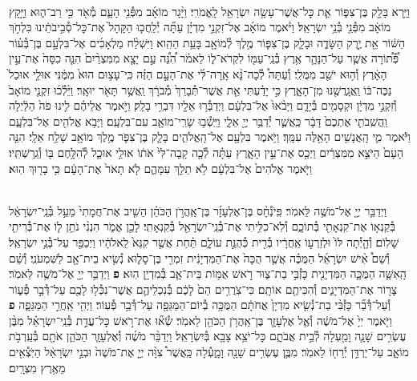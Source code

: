 \documentclass[twoside, openany, parskip=half, 11pt]{book}
\begin{document}
\begin{footnotesize}
\begin{multicols}{2}
\\
וַיַּ֥רְא בָּלָ֖ק בֶּן־צִפּ֑וֹר אֵ֛ת כׇּל־אֲשֶׁר־עָשָׂ֥ה יִשְׂרָאֵ֖ל לָֽאֱמֹרִֽי׃ וַיָּ֨גָר מוֹאָ֜ב מִפְּ֯נֵ֥י הָעָ֛ם מְ֯אֹ֖ד כִּ֣י רַב־ה֑וּא וַיָּ֣קָץ מוֹאָ֔ב מִפְּ֯נֵ֖י בְּ֯נֵ֥י יִשְׂרָאֵֽל׃ וַיֹּ֨אמֶר מוֹאָ֜ב אֶל־זִקְנֵ֣י מִדְיָ֗ן עַתָּ֞ה יְ֯לַֽחֲכ֤וּ הַקָּהָל֙ אֶת־כׇּל־סְ֯בִ֣יבֹתֵ֔ינוּ כִּלְחֹ֣ךְ הַשּׁ֔וֹר אֵ֖ת יֶ֣רֶק הַשָּׂדֶ֑ה וּבָלָ֧ק בֶּן־צִפּ֛וֹר מֶ֥לֶךְ לְ֯מוֹאָ֖ב בָּעֵ֥ת הַהִֽוא׃  וַיִּשְׁלַ֨ח מַלְאָכִ֜ים אֶל־בִּלְעָ֣ם בֶּן־בְּ֯ע֗וֹר פְּ֠֯ת֠וֹרָה אֲשֶׁ֧ר עַל־הַנָּהָ֛ר אֶ֥רֶץ בְּ֯נֵֽי־עַמּ֖וֹ לִקְרֹא־ל֑וֹ לֵאמֹ֗ר הִ֠נֵּ֠ה עַ֣ם יָצָ֤א מִמִּצְרַ֨יִם֙ הִנֵּ֤ה כִסָּה֙ אֶת־עֵ֣ין הָאָ֔רֶץ וְ֯ה֥וּא יֹשֵׁ֖ב מִמֻּלִֽי׃ וְ֯עַתָּה֩ לְ֯כָה־נָּ֨א אָֽרָה־לִּ֜י אֶת־הָעָ֣ם הַזֶּ֗ה כִּֽי־עָצ֥וּם הוּא֙ מִמֶּ֔נִּי אוּלַ֤י אוּכַל֙ נַכֶּה־בּ֔וֹ וַֽאֲגָֽרֲשֶׁ֖נּוּ מִן־הָאָ֑רֶץ כִּ֣י יָדַ֗עְתִּי אֵ֤ת אֲשֶׁר־תְּ֯בָרֵךְ֙ מְ֯בֹרָ֔ךְ וַֽאֲשֶׁ֥ר תָּאֹ֖ר יוּאָֽר׃ וַיֵּ֨לְ֯כ֜וּ זִקְנֵ֤י מוֹאָב֙ וְ֯זִקְנֵ֣י מִדְיָ֔ן וּקְסָמִ֖ים בְּ֯יָדָ֑ם וַיָּבֹ֨אוּ֙ אֶל־בִּלְעָ֔ם וַיְדַבְּ֯ר֥וּ אֵלָ֖יו דִּבְרֵ֥י בָלָֽק׃  וַיֹּ֣אמֶר אֲלֵיהֶ֗ם לִ֤ינוּ פֹה֙ הַלַּ֔יְלָה וַֽהֲשִֽׁבֹתִ֤י אֶתְכֶם֙ דָּבָ֔ר כַּֽאֲשֶׁ֛ר יְ֯דַבֵּ֥ר יְיָ֖ אֵלָ֑י וַיֵּֽשְׁ֯ב֥וּ שָׂרֵֽי־מוֹאָ֖ב עִם־בִּלְעָֽם׃ וַיָּבֹ֥א אֱלֹהִ֖ים אֶל־בִּלְעָ֑ם וַיֹּ֕אמֶר מִ֛י הָֽאֲנָשִׁ֥ים הָאֵ֖לֶּה עִמָּֽךְ׃ וַיֹּ֥אמֶר בִּלְעָ֖ם אֶל־הָֽאֱלֹהִ֑ים בָּלָ֧ק בֶּן־צִפֹּ֛ר מֶ֥לֶךְ מוֹאָ֖ב שָׁלַ֥ח אֵלָֽי׃ הִנֵּ֤ה הָעָם֙ הַיֹּצֵ֣א מִמִּצְרַ֔יִם וַיְכַ֖ס אֶת־עֵ֣ין הָאָ֑רֶץ עַתָּ֗ה לְ֯כָ֤ה קָֽבָה־לִּי֙ אֹת֔וֹ אוּלַ֥י אוּכַ֛ל לְ֯הִלָּ֥חֶם בּ֖וֹ וְ֯גֵֽרַשְׁתִּֽיו׃ וַיֹּ֤אמֶר אֱלֹהִים֙ אֶל־בִּלְעָ֔ם לֹ֥א תֵלֵ֖ךְ עִמָּהֶ֑ם לֹ֤א תָאֹר֙ אֶת־הָעָ֔ם כִּ֥י בָר֖וּךְ הֽוּא׃

\\
וַיְדַבֵּ֥ר יְיָ֖ אֶל־מֹשֶׁ֥ה לֵּאמֹֽר׃ פִּֽיֹנְ֯חָ֨ס בֶּן־אֶלְעָזָ֜ר בֶּן־אַֽהֲרֹ֣ן הַכֹּהֵ֗ן הֵשִׁ֤יב אֶת־חֲמָתִי֙ מֵעַ֣ל בְּ֯נֵֽי־יִשְׂרָאֵ֔ל בְּ֯קַנְא֥וֹ אֶת־קִנְאָתִ֖י בְּ֯תוֹכָ֑ם וְ֯לֹֽא־כִלִּ֥יתִי אֶת־בְּ֯נֵֽי־יִשְׂרָאֵ֖ל בְּ֯קִנְאָתִֽי׃ לָכֵ֖ן אֱמֹ֑ר הִנְנִ֨י נֹתֵ֥ן ל֛וֹ אֶת־בְּ֯רִיתִ֖י שָׁלֽוֹֹם׃  וְ֯הָ֤יְ֯תָה לּוֹ֙ וּלְזַרְע֣וֹ אַֽחֲרָ֔יו בְּ֯רִ֖ית כְּ֯הֻנַּ֣ת עוֹלָ֑ם תַּ֗חַת אֲשֶׁ֤ר קִנֵּא֙ לֵֽאלֹהָ֔יו וַיְכַפֵּ֖ר עַל־בְּ֯נֵ֥י יִשְׂרָאֵֽל׃ וְ֯שֵׁם֩ אִ֨ישׁ יִשְׂרָאֵ֜ל הַמֻּכֶּ֗ה אֲשֶׁ֤ר הֻכָּה֙ אֶת־הַמִּדְיָנִ֔ית זִמְרִ֖י בֶּן־סָל֑וּא נְ֯שִׂ֥יא בֵית־אָ֖ב לַשִּׁמְעֹנִֽי׃ וְ֯שֵׁ֨ם הָֽאִשָּׁ֧ה הַמֻּכָּ֛ה הַמִּדְיָנִ֖ית כָּזְ֯בִּ֣י בַת־צ֑וּר רֹ֣אשׁ אֻמּ֥וֹת בֵּית־אָ֛ב בְּ֯מִדְיָ֖ן הֽוּא׃ \textbf{פ}
וַיְדַבֵּ֥ר יְיָ֖ אֶל־מֹשֶׁ֥ה לֵּאמֹֽר׃ צָר֖וֹר אֶת־הַמִּדְיָנִ֑ים וְ֯הִכִּיתֶ֖ם אוֹתָֽם׃ כִּי־צֹֽרֲרִ֥ים הֵם֙ לָכֶ֔ם בְּ֯נִכְלֵיהֶ֛ם אֲשֶׁר־נִכְּ֯ל֥וּ לָכֶ֖ם עַל־דְּ֯בַ֣ר פְּ֯ע֑וֹר וְ֯עַל־דְּ֯בַ֞ר כָּזְ֯בִּ֨י בַת־נְ֯שִׂ֤יא מִדְיָן֙ אֲחֹתָ֔ם הַמֻּכָּ֥ה בְ֯יוֹם־הַמַּגֵּפָ֖ה עַל־דְּ֯בַ֥ר פְּ֯עֽוֹר׃ וַיְהִ֖י אַֽחֲרֵ֣י הַמַּגֵּפָ֑ה \textbf{פ}
וַיֹּ֤אמֶר יְיָ֙ אֶל־מֹשֶׁ֔ה וְ֯אֶ֧ל אֶלְעָזָ֛ר בֶּן־אַֽהֲרֹ֥ן הַכֹּהֵ֖ן לֵאמֹֽר׃ שְׂ֯א֞וּ אֶת־רֹ֣אשׁ כׇּל־עֲדַ֣ת בְּ֯נֵֽי־יִשְׂרָאֵ֗ל מִבֶּ֨ן עֶשְׂרִ֥ים שָׁנָ֛ה וָמַ֖עְלָה לְ֯בֵ֣ית אֲבֹתָ֑ם כׇּל־יֹצֵ֥א צָבָ֖א בְּ֯יִשְׂרָאֵֽל׃ וַיְדַבֵּ֨ר מֹשֶׁ֜ה וְ֯אֶלְעָזָ֧ר הַכֹּהֵ֛ן אֹתָ֖ם בְּ֯עַֽרְבֹ֣ת מוֹאָ֑ב עַל־יַרְדֵּ֥ן יְ֯רֵח֖וֹ לֵאמֹֽר׃ מִבֶּ֛ן עֶשְׂרִ֥ים שָׁנָ֖ה וָמָ֑עְ֯לָה כַּֽאֲשֶׁר֩ צִוָּ֨ה יְיָ֤ אֶת־מֹשֶׁה֙ וּבְנֵ֣י יִשְׂרָאֵ֔ל הַיֹּֽצְ֯אִ֖ים מֵאֶ֥רֶץ מִצְרָֽיִם׃



\end{multicols}
\end{footnotesize}
\end{document}
